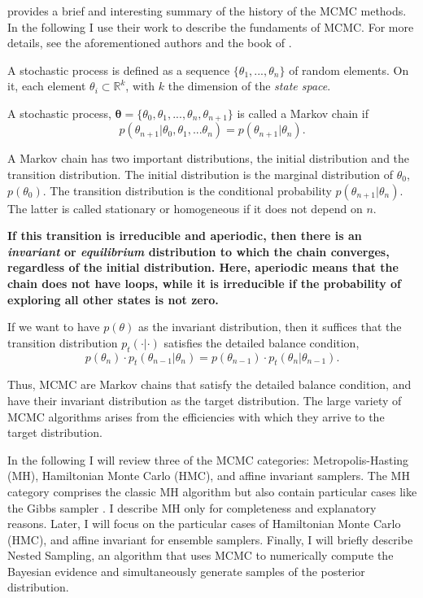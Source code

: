 \citet{Andrieu2003} provides a brief and interesting summary of the history of the MCMC methods. In the following I use their work to describe the fundaments of MCMC. For more details, see the aforementioned authors and the book of \citet{Brooks2011}.

A stochastic process is defined as a sequence  $\{\theta_1,...,\theta_n\}$ of random elements. On it, each element $\theta_i \subset \mathbb{R}^k$,  with $k$ the dimension of the \emph{state space}. 

A stochastic process, $\boldsymbol{\theta}=\{\theta_0,\theta_1,...,\theta_n,\theta_{n+1}\}$ is called a Markov chain if
\begin{equation}
p(\theta_{n+1} | \theta_0,\theta_1,...\theta_n) = p(\theta_{n+1} |\theta_n). \nonumber
\end{equation}

A Markov chain has two important distributions, the initial distribution and the transition distribution. The initial distribution is the marginal distribution of $\theta_0$, $p(\theta_0)$. The transition distribution is the conditional probability $p(\theta_{n+1} |\theta_n)$. The latter is called stationary or homogeneous if it does not depend on $n$.

\textbf{If this transition is irreducible and aperiodic, then there is an \emph{invariant} or \emph{equilibrium} distribution to which the chain converges, regardless of the initial distribution. Here, aperiodic means that the chain does not have loops, while it is irreducible if the probability of exploring all other states is not zero.}

If we want to have $p(\theta)$ as the invariant distribution, then it suffices that the transition distribution $p_t(\cdot | \cdot)$ satisfies the detailed balance condition,
\begin{equation}
\label{eq:detailedbalance}
p(\theta_{n})\cdot p_t(\theta_{n-1}|\theta_n)=p(\theta_{n-1})\cdot p_t(\theta_n | \theta_{n-1}).
\end{equation}

Thus, MCMC are Markov chains that satisfy the detailed balance condition, and have their invariant distribution as the target distribution. 
The large variety of MCMC algorithms arises from the efficiencies with which they arrive to the target distribution.

In the following I will review three of the MCMC categories: Metropolis-Hasting (MH), Hamiltonian Monte Carlo (HMC), and affine invariant samplers. The MH category comprises the classic MH algorithm but also contain particular cases like the Gibbs sampler \citep{Geman1984}. I describe MH only for completeness and explanatory reasons. Later, I will focus on the particular cases of Hamiltonian Monte Carlo (HMC), and affine invariant for ensemble samplers. Finally, I will briefly describe Nested Sampling, an algorithm that uses MCMC to numerically compute the Bayesian evidence and simultaneously generate samples of the posterior distribution. 
